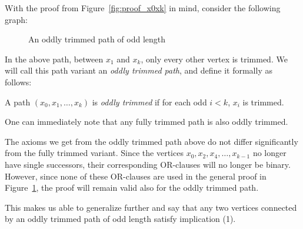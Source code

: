 With the proof from Figure~\ref{fig:proof_x0xk} in mind, consider the following graph:\par
\begin{figure}[!h]
  \centering
  \caption{An oddly trimmed path of odd length}
  \label{fig:oddly_trimmed_path}
\end{figure}
\FloatBarrier
In the above path, between $x_1$ and $x_k$, only every other vertex is trimmed.
We will call this path variant an \textit{oddly trimmed path}, and define it formally as follows:
\begin{definition}
  A path $(x_0, x_1, \dots , x_k)$ is \textit{oddly trimmed} if for each odd $i < k$, $x_i$ is trimmed.
\end{definition}
One can immediately note that any fully trimmed path is also oddly trimmed.

The axioms we get from the oddly trimmed path above do not differ significantly from the fully trimmed variant.
Since the vertices $x_0, x_2, x_4, \dots ,x_{k-1}$ no longer have single successors, their corresponding OR-clauses will no longer be binary.
However, since none of these OR-clauses are used in the general proof in Figure~\ref{fig:oddly_trimmed_path}, the proof will remain valid also for the oddly trimmed path.

This makes us able to generalize further and say that any two vertices connected by an oddly trimmed path of odd length satisfy implication (1).

